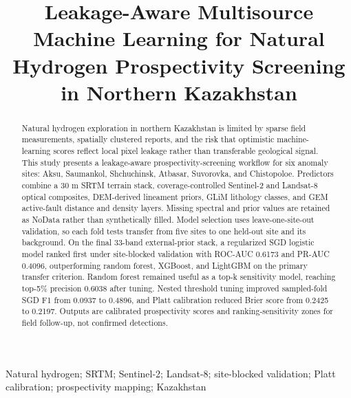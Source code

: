 \documentclass[numrefs]{interact}
\theoremstyle{plain}%
\theoremstyle{definition}
\theoremstyle{remark}
\begin{document}
\articletype{}%

\title{Leakage-Aware Multisource Machine Learning for Natural Hydrogen Prospectivity Screening in Northern Kazakhstan}

\author{
}
\maketitle

\begin{abstract}
Natural hydrogen exploration in northern Kazakhstan is limited by sparse field measurements, spatially clustered reports, and the risk that optimistic machine-learning scores reflect local pixel leakage rather than transferable geological signal. This study presents a leakage-aware prospectivity-screening workflow for six anomaly sites: Aksu, Saumankol, Shchuchinsk, Atbasar, Suvorovka, and Chistopoloe. Predictors combine a 30 m SRTM terrain stack, coverage-controlled Sentinel-2 and Landsat-8 optical composites, DEM-derived lineament priors, GLiM lithology classes, and GEM active-fault distance and density layers. Missing spectral and prior values are retained as NoData rather than synthetically filled. Model selection uses leave-one-site-out validation, so each fold tests transfer from five sites to one held-out site and its background. On the final 33-band external-prior stack, a regularized SGD logistic model ranked first under site-blocked validation with ROC-AUC 0.6173 and PR-AUC 0.4096, outperforming random forest, XGBoost, and LightGBM on the primary transfer criterion. Random forest remained useful as a top-k sensitivity model, reaching top-5\% precision 0.6038 after tuning. Nested threshold tuning improved sampled-fold SGD F1 from 0.0937 to 0.4896, and Platt calibration reduced Brier score from 0.2425 to 0.2197. Outputs are calibrated prospectivity scores and ranking-sensitivity zones for field follow-up, not confirmed detections.
\end{abstract}

\begin{keywords}
Natural hydrogen; SRTM; Sentinel-2; Landsat-8; site-blocked validation; Platt calibration; prospectivity mapping; Kazakhstan
\end{keywords}
\end{document}
